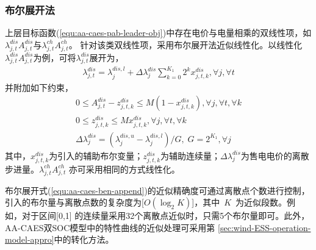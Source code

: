 \subsubsection{布尔展开法}
上层目标函数(\ref{equ:aa-caes-pab-leader-obj})中存在电价与电量相乘的双线性项，如$\lambda _{j,t}^{dis}A_{j,t}^{dis}$与$\lambda _{j,t}^{ch}A_{j,t}^{ch}$。 针对该类双线性项，采用布尔展开法\cite{Binary-Expansion-1,Binary-Expansion-2}近似线性化。以线性化$\lambda _{j,t}^{dis}A_{j,t}^{dis}$为例，可将$\lambda _{j,t}^{dis}$展开为，
\begin{eqnarray}
\label{equ:aa-caes-ben-1}
\lambda _{j,t}^{dis} = \lambda _j^{dis,l} + \Delta \lambda _j^{dis}\sum\limits_{k = 0}^{{K_1}} {{2^k}} x_{j,t,k}^{dis},\forall j,\forall t
\end{eqnarray}
并附加如下约束，
\begin{subequations}
\label{equ:aa-caes-ben-append}
\begin{gather}
0 \le A_{j,t}^{dis} - z_{j,t,k}^{dis} \le M({1 - x_{j,t,k}^{dis}}),\forall j,\forall t,\forall k\\
0 \le z_{j,t,k}^{dis} \le Mx_{j,t,k}^{dis},\forall j,\forall t,\forall k\\
\Delta \lambda _j^{dis} = ({\lambda _j^{dis,u} - \lambda _j^{dis,l}})/G,\;G = {2^{{K_1}}},\forall j
\end{gather}
\end{subequations}
其中，$x_{j,t,k}^{dis}$为引入的辅助布尔变量；$z_{j,t,k}^{dis}$为辅助连续量；$\Delta \lambda _j^{dis}$为售电电价的离散步进量。$\lambda _{j,t}^{ch}A_{j,t}^{ch}$ 亦可采用相同的方式线性化。

布尔展开式(\ref{equ:aa-caes-ben-append})的近似精确度可通过离散点个数进行控制，引入的布尔量与离散点数的复杂度为[$O(\log_2{K})$]，其中~$K$~为近似段数。例如，对于区间[0,1] 的连续量采用32个离散点近似时，只需5个布尔量即可。此外，AA-CAES双SOC模型中的特性曲线的近似处理可采用第
\ref{sec:wind-ESS-operation-model-appro}中的转化方法。

